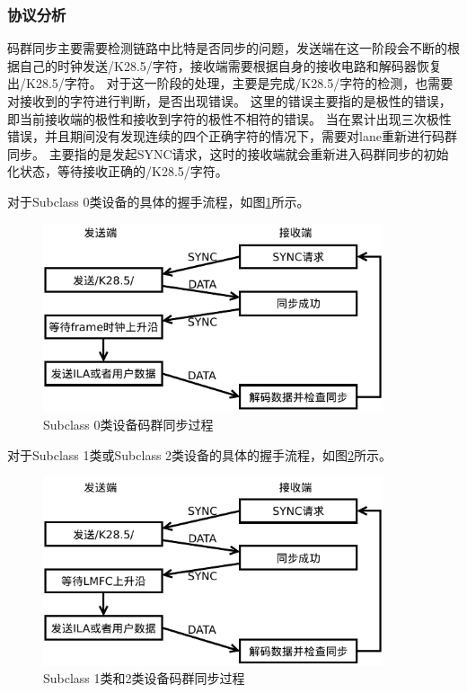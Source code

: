 \documentclass[UTF8]{ctexart}
\begin{document}
\subsubsection{协议分析}

码群同步主要需要检测链路中比特是否同步的问题，发送端在这一阶段会不断的根据自己的时钟发送/K28.5/字符，接收端需要根据自身的接收电路和解码器恢复出/K28.5/字符。
对于这一阶段的处理，主要是完成/K28.5/字符的检测，也需要对接收到的字符进行判断，是否出现错误。
这里的错误主要指的是极性的错误，即当前接收端的极性和接收到字符的极性不相符的错误。
当在累计出现三次极性错误，并且期间没有发现连续的四个正确字符的情况下，需要对lane重新进行码群同步。
主要指的是发起SYNC请求，这时的接收端就会重新进入码群同步的初始化状态，等待接收正确的/K28.5/字符。

对于Subclass 0类设备的具体的握手流程，如图\ref{fig:cgs_subclass_0}所示。

\begin{figure}[H]
\centering
\includegraphics[width=10cm]{./img/cgs_subclass_0.pdf}
\caption{Subclass 0类设备码群同步过程}
\label{fig:cgs_subclass_0}
\end{figure}

对于Subclass 1类或Subclass 2类设备的具体的握手流程，如图\ref{fig:cgs_subclass_1_2}所示。

\begin{figure}[H]
\centering
\includegraphics[width=10cm]{./img/cgs_subclass_1_2.pdf}
\caption{Subclass 1类和2类设备码群同步过程}
\label{fig:cgs_subclass_1_2}
\end{figure}
\end{document}
